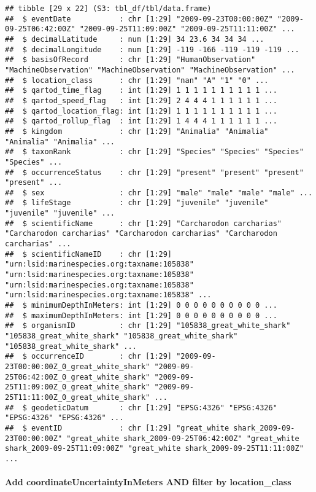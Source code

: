 \documentclass[
]{book}
\begin{document}
\begin{verbatim}
## tibble [29 x 22] (S3: tbl_df/tbl/data.frame)
##  $ eventDate           : chr [1:29] "2009-09-23T00:00:00Z" "2009-09-25T06:42:00Z" "2009-09-25T11:09:00Z" "2009-09-25T11:11:00Z" ...
##  $ decimalLatitude     : num [1:29] 34 23.6 34 34 34 ...
##  $ decimalLongitude    : num [1:29] -119 -166 -119 -119 -119 ...
##  $ basisOfRecord       : chr [1:29] "HumanObservation" "MachineObservation" "MachineObservation" "MachineObservation" ...
##  $ location_class      : chr [1:29] "nan" "A" "1" "0" ...
##  $ qartod_time_flag    : int [1:29] 1 1 1 1 1 1 1 1 1 1 ...
##  $ qartod_speed_flag   : int [1:29] 2 4 4 4 1 1 1 1 1 1 ...
##  $ qartod_location_flag: int [1:29] 1 1 1 1 1 1 1 1 1 1 ...
##  $ qartod_rollup_flag  : int [1:29] 1 4 4 4 1 1 1 1 1 1 ...
##  $ kingdom             : chr [1:29] "Animalia" "Animalia" "Animalia" "Animalia" ...
##  $ taxonRank           : chr [1:29] "Species" "Species" "Species" "Species" ...
##  $ occurrenceStatus    : chr [1:29] "present" "present" "present" "present" ...
##  $ sex                 : chr [1:29] "male" "male" "male" "male" ...
##  $ lifeStage           : chr [1:29] "juvenile" "juvenile" "juvenile" "juvenile" ...
##  $ scientificName      : chr [1:29] "Carcharodon carcharias" "Carcharodon carcharias" "Carcharodon carcharias" "Carcharodon carcharias" ...
##  $ scientificNameID    : chr [1:29] "urn:lsid:marinespecies.org:taxname:105838" "urn:lsid:marinespecies.org:taxname:105838" "urn:lsid:marinespecies.org:taxname:105838" "urn:lsid:marinespecies.org:taxname:105838" ...
##  $ minimumDepthInMeters: int [1:29] 0 0 0 0 0 0 0 0 0 0 ...
##  $ maximumDepthInMeters: int [1:29] 0 0 0 0 0 0 0 0 0 0 ...
##  $ organismID          : chr [1:29] "105838_great_white_shark" "105838_great_white_shark" "105838_great_white_shark" "105838_great_white_shark" ...
##  $ occurrenceID        : chr [1:29] "2009-09-23T00:00:00Z_0_great_white_shark" "2009-09-25T06:42:00Z_0_great_white_shark" "2009-09-25T11:09:00Z_0_great_white_shark" "2009-09-25T11:11:00Z_0_great_white_shark" ...
##  $ geodeticDatum       : chr [1:29] "EPSG:4326" "EPSG:4326" "EPSG:4326" "EPSG:4326" ...
##  $ eventID             : chr [1:29] "great_white shark_2009-09-23T00:00:00Z" "great_white shark_2009-09-25T06:42:00Z" "great_white shark_2009-09-25T11:09:00Z" "great_white shark_2009-09-25T11:11:00Z" ...
\end{verbatim}

\hypertarget{add-coordinateuncertaintyinmeters-and-filter-by-location_class}{%
\paragraph{Add coordinateUncertaintyInMeters AND filter by location\_class}\label{add-coordinateuncertaintyinmeters-and-filter-by-location_class}}
\end{document}

